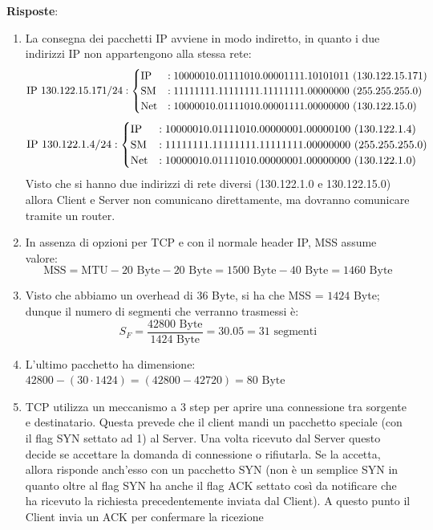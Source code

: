 \documentclass[10pt,a4paper]{article}
\begin{document}
	\textbf{Risposte}:
	\begin{enumerate}
		\item La consegna dei pacchetti IP avviene in modo indiretto, in quanto i due indirizzi IP non appartengono alla stessa rete:
			\[
				\textnormal{IP } 130.122.15.171/24:
				\begin{cases}
					\textnormal{IP} & : 10000010.01111010.00001111.10101011 \,\,(130.122.15.171)\\
					\textnormal{SM} & : 11111111.11111111.11111111.00000000 \,\,(255.255.255.0) \\
					\textnormal{Net} & : 10000010.01111010.00001111.00000000 \,\,(130.122.15.0)
				\end{cases}
			\]
			\[
				\textnormal{IP } 130.122.1.4/24:
				\begin{cases}
					\textnormal{IP} & : 10000010.01111010.00000001.00000100 \,\,(130.122.1.4)\\
					\textnormal{SM} & : 11111111.11111111.11111111.00000000 \,\,(255.255.255.0) \\
					\textnormal{Net} & : 10000010.01111010.00000001.00000000 \,\,(130.122.1.0)
				\end{cases}
			\]
			Visto che si hanno due indirizzi di rete diversi (130.122.1.0 e 130.122.15.0) allora Client e Server non comunicano direttamente, ma dovranno comunicare tramite un router.
		\item In assenza di opzioni per TCP e con il normale header IP, MSS assume valore: $$\textrm{MSS} = \textrm{MTU} - 20 \textrm{ Byte} - 20 \textrm{ Byte} = 1500 \textrm{ Byte} - 40 \textrm{ Byte} = 1460 \textrm{ Byte}$$
		\item Visto che abbiamo un overhead di $36$ Byte, si ha che MSS = $1424$ Byte; dunque il numero di segmenti che verranno trasmessi è:
		$$S_F = \frac{42800 \textrm{ Byte}}{1424 \textrm{ Byte}} = 30.05 = 31 \textrm{ segmenti}$$
		\item L'ultimo pacchetto ha dimensione: $42800 - (30 \cdot 1424) = (42800 - 42720) = 80 \textrm{ Byte}$
		\item TCP utilizza un meccanismo a 3 step per aprire una connessione tra sorgente e destinatario. Questa prevede che il client mandi un pacchetto speciale (con il flag SYN settato ad 1) al Server. Una volta ricevuto dal Server questo decide se accettare la domanda di connessione o rifiutarla. 
		Se la accetta, allora risponde anch'esso con un pacchetto SYN (non è un semplice SYN in quanto oltre al flag SYN ha anche il flag ACK settato così da notificare che ha ricevuto la richiesta precedentemente inviata dal Client). A questo punto il Client invia un ACK per confermare la ricezione 

\end{enumerate}
\end{document}
